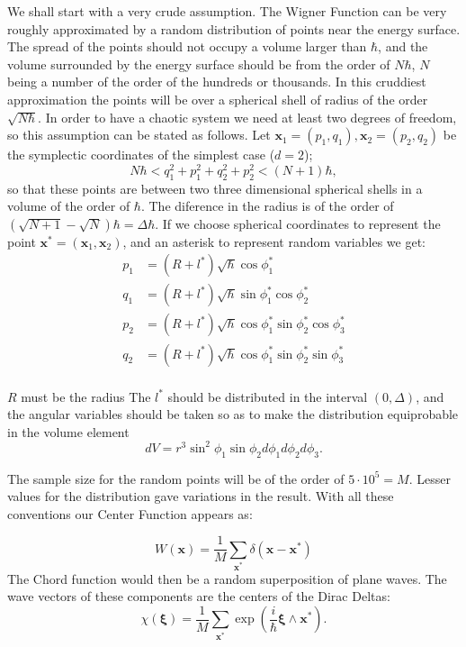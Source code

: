 \documentclass[a4paper,12pt]{article}
\newcommand{\ihb}{\frac{i}{\hbar}}
\newcommand{\xfase}{\mathbf{x}}
\newcommand{\xifase}{ {\boldsymbol{\xi}} }
\begin{document}
We shall start with a very crude assumption.
 The Wigner Function can be very roughly approximated
by a random distribution of points near the energy surface. 
The spread of the points should not occupy a volume larger than
$\hbar$, and the volume surrounded by the energy surface
should be from the order of $N\hbar$, $N$ being a number
of the order of the hundreds or thousands.  In this cruddiest
approximation the points will be over a spherical shell of
radius of the order $\sqrt{N\hbar}$. In order to have
a chaotic system we need at least two degrees of freedom, so
this assumption can be stated as follows. Let
$\xfase_1=(p_1,q_1), \xfase_2=(p_2,q_2) $ be the 
symplectic coordinates
of the simplest case ($d=2$);  
\begin{equation}
N\hbar< q_1^2+p_1^2+q_2^2+p_2^2<(N+1)\hbar,
\end{equation}
so that these points are between two three dimensional
spherical shells in a volume of the order of $\hbar$. 
The diference in the radius is of the order of
$(\sqrt{N+1}-\sqrt{N})\hbar=\Delta\hbar$.
If we choose spherical coordinates to represent
the point $\xfase^*=(\xfase_1, \xfase_2)$, and an 
asterisk to represent random variables we get:
\begin{equation}
\begin{split}
p_1&=(R+l^*)\sqrt{\hbar}\cos \phi_1^* \\
q_1&=(R+l^*)\sqrt{\hbar}\sin \phi_1^* \cos\phi_2^*\\
p_2&=(R+l^*)\sqrt{\hbar}\cos \phi_1^*\sin\phi_2^*\cos\phi_3^* \\
q_2&=(R+l^*)\sqrt{\hbar}\cos \phi_1^* \sin\phi_2^*\sin\phi_3^* \\
\end{split}
\end{equation}

$R$ must be the radius
The $l^*$ should be distributed in the interval
$(0, \Delta)$, and the angular variables should 
be taken so as to make the distribution equiprobable in
the volume element
\begin{equation}
dV=r^3 \sin^2\phi_1\sin\phi_2 d\phi_1 d\phi_2 d\phi_3.
\end{equation}

The sample size for the
random points  will be of the order of $5 \cdot 10^5=M$.
Lesser values for the distribution gave variations in
the result.
With all these conventions our Center Function appears
as:

\begin{equation}\label{AproxCruda}
W(\xfase)=\frac{1}{M}\sum_{\xfase^*} \delta (\xfase - \xfase^*)
\end{equation}
The Chord function would then be a random superposition
of plane waves. The wave vectors of these components are
the centers of the Dirac Deltas:
\begin{equation}\label{chordfun}
\chi(\xifase)=\frac{1}{M}\sum_{\xfase^*} \exp \left( \ihb \xifase\wedge\xfase^* \right).
\end{equation}
\end{document}
